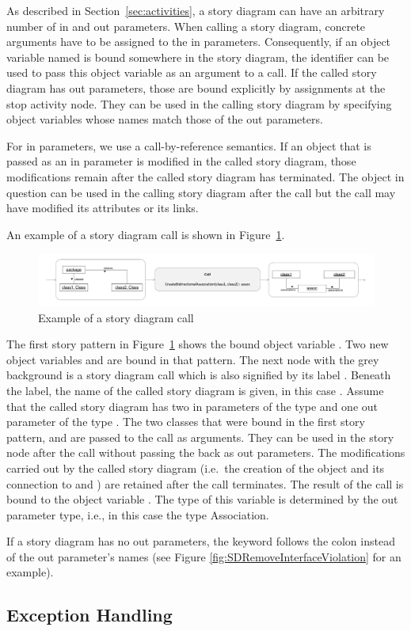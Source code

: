 As described in Section~\ref{sec:activities}, a story diagram can have an arbitrary number of in and out parameters. When calling a story diagram, concrete arguments have to be assigned to the in parameters. Consequently, if an object variable named  is bound somewhere in the story diagram, the identifier  can be used to pass this object variable as an argument to a call. If the called story diagram has out parameters, those are bound explicitly by assignments at the stop activity node. They can be used in the calling story diagram by specifying object variables whose names match those of the out parameters.

For in parameters, we use a call-by-reference semantics. If an object that is passed as an in parameter is modified in the called story diagram, those modifications remain after the called story diagram has terminated. The object in question can be used in the calling story diagram after the call but the call may have modified its attributes or its links.

An example of a story diagram call is shown in Figure~\ref{fig:call}.

\begin{figure}[htb]
\begin{center}
  \includegraphics[width=\textwidth]{figures/StoryDiagramCall}
  \caption{Example of a story diagram call}
  \label{fig:call}
\end{center}
\end{figure}

The first story pattern in Figure~\ref{fig:call} shows the bound object variable . Two new object variables  and  are bound in that pattern. The next node with the grey background is a story diagram call which is also signified by its label . Beneath the label, the name of the called story diagram is given, in this case . Assume that the called story diagram has two in parameters of the type  and one out parameter of the type . The two classes that were bound in the first story pattern,  and  are passed to the call as arguments. They can be used in the story node after the call without passing the back as out parameters. The modifications carried out by the called story diagram (i.e.\ the creation of the  object and its connection to  and ) are retained after the call terminates.
The result of the call is bound to the object variable . The type of this variable is determined by the out parameter type, i.e., in this case the type Association.

If a story diagram has no out parameters, the keyword  follows the colon instead of the out parameter's names (see Figure \ref{fig:SDRemoveInterfaceViolation} for an example).


{
\subsection{Exception Handling}
}



